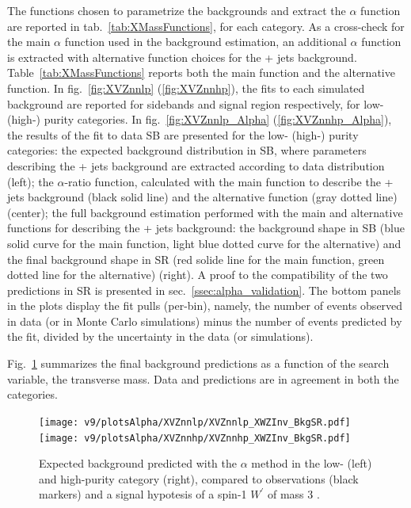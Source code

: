 \noindent The functions chosen to parametrize the backgrounds and extract the $\alpha$ function are reported in tab.~\ref{tab:XMassFunctions}, for each category. As a cross-check for the main $\alpha$ function used in the background estimation, an additional $\alpha$ function is extracted with alternative function choices for the \V + jets background. Table~\ref{tab:XMassFunctions} reports both the main function and the alternative function. In fig.~\ref{fig:XVZnnlp} (\ref{fig:XVZnnhp}), the fits to each simulated background are reported for sidebands and signal region respectively, for low- (high-) purity categories. In fig.~\ref{fig:XVZnnlp_Alpha} (\ref{fig:XVZnnhp_Alpha}), the results of the fit to data SB are presented for the low- (high-) purity categories: the expected background distribution in SB, where parameters describing the \V + jets background are extracted according to data distribution (left); the $\alpha$-ratio function, calculated with the main function to describe the \V + jets background (black solid line) and the alternative function (gray dotted line) (center); the full background estimation performed with the main and alternative functions for describing the \V + jets background: the background shape in SB (blue solid curve for the main function, light blue dotted curve for the alternative) and the final background shape in SR (red solide line for the main function, green dotted line for the alternative) (right). A proof to the compatibility of the two predictions in SR is presented in sec.~\ref{ssec:alpha_validation}. The bottom panels in the plots display the fit pulls (per-bin), namely, the number of events observed in data (or in Monte Carlo simulations) minus the number of events predicted by the fit, divided by the uncertainty in the data (or simulations). 











\noindent Fig.~\ref{fig:XVZnn_Exp} summarizes the final background predictions as a function of the search variable, the transverse mass. Data and predictions are in agreement in both the categories. 

\begin{figure}[!htb]
  \centering
    \texttt{[image: v9/plotsAlpha/XVZnnlp/XVZnnlp\_XWZInv\_BkgSR.pdf]}
    \texttt{[image: v9/plotsAlpha/XVZnnhp/XVZnnhp\_XWZInv\_BkgSR.pdf]}
  \caption{Expected background predicted with the $\alpha$ method in the low- (left) and high-purity category (right), compared to observations (black markers) and a signal hypotesis of a spin-1 $W^{'}$ of mass 3 \TeV.}
  \label{fig:XVZnn_Exp}
\end{figure}

